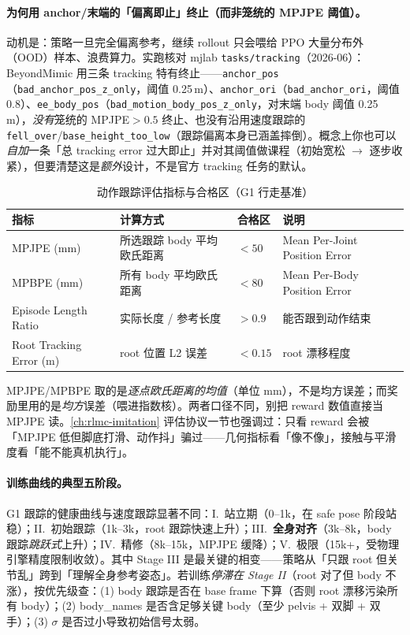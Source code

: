 \paragraph{为何用 anchor/末端的「偏离即止」终止（而非笼统的 MPJPE 阈值）。}动机是：策略一旦完全偏离参考，继续 rollout 只会喂给 PPO 大量分布外（OOD）样本、浪费算力。实跑核对 mjlab \verb|tasks/tracking|（2026-06）：BeyondMimic 用三条 tracking 特有终止——\verb|anchor_pos|（\verb|bad_anchor_pos_z_only|，阈值 0.25\,m）、\verb|anchor_ori|（\verb|bad_anchor_ori|，阈值 0.8）、\verb|ee_body_pos|（\verb|bad_motion_body_pos_z_only|，对末端 body 阈值 0.25\,m），\emph{没有}笼统的 MPJPE$>0.5$ 终止、也没有沿用速度跟踪的 \verb|fell_over|/\verb|base_height_too_low|（跟踪偏离本身已涵盖摔倒）。概念上你也可以\emph{自加}一条「总 tracking error 过大即止」并对其阈值做课程（初始宽松 $\to$ 逐步收紧），但要清楚这是\emph{额外}设计，不是官方 tracking 任务的默认。

\begin{table}[ht]
\centering
\small
\caption{动作跟踪评估指标与合格区（G1 行走基准）}
\label{tab:rlmc-mi-eval}
\begin{tabular}{@{}llll@{}}
\toprule
指标 & 计算方式 & 合格区 & 说明 \\
\midrule
MPJPE (mm) & 所选跟踪 body 平均欧氏距离 & $<50$ & Mean Per-Joint Position Error \\
MPBPE (mm) & 所有 body 平均欧氏距离 & $<80$ & Mean Per-Body Position Error \\
Episode Length Ratio & 实际长度 / 参考长度 & $>0.9$ & 能否跟到动作结束 \\
Root Tracking Error (m) & root 位置 L2 误差 & $<0.15$ & root 漂移程度 \\
\bottomrule
\end{tabular}
\end{table}

\begin{note}
MPJPE/MPBPE 取的是\emph{逐点欧氏距离的均值}（单位 mm），不是均方误差；而奖励里用的是\emph{均方}误差（喂进指数核）。两者口径不同，别把 reward 数值直接当 MPJPE 读。\cref{ch:rlmc-imitation} 评估协议一节也强调过：只看 reward 会被「MPJPE 低但脚底打滑、动作抖」骗过——几何指标看「像不像」，接触与平滑度看「能不能真机执行」。
\end{note}

\paragraph{训练曲线的典型五阶段。}G1 跟踪的健康曲线与速度跟踪显著不同：I.\ 站立期（0--1k，在 safe pose 阶段站稳）；II.\ 初始跟踪（1k--3k，root 跟踪快速上升）；III.\ \textbf{全身对齐}（3k--8k，body 跟踪\emph{跳跃式}上升）；IV.\ 精修（8k--15k，MPJPE 缓降）；V.\ 极限（15k+，受物理引擎精度限制收敛）。其中 Stage III 是最关键的相变——策略从「只跟 root 但关节乱」跨到「理解全身参考姿态」。若训练\emph{停滞在 Stage II}（root 对了但 body 不涨），按优先级查：(1) body 跟踪是否在 base frame 下算（否则 root 漂移污染所有 body）；(2) body\_names 是否含足够关键 body（至少 pelvis + 双脚 + 双手）；(3) $\sigma$ 是否过小导致初始信号太弱。

